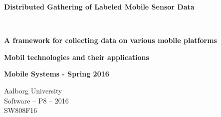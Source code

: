 
\begin{center}
	
	\vspace{8cm}

	\begin{spacing}{2.1}
		\begin{Huge}
			\textbf{Distributed Gathering of Labeled Mobile Sensor Data}
		\end{Huge}
		\\
		\begin{huge}
			\textbf{A framework for collecting data on various mobile platforms}
		\end{huge}
	\end{spacing}

	\vspace{0.6cm}

	\begin{Large}
		\textbf{Mobil technologies and their applications}
	\end{Large}

	\vspace{1cm}

	\begin{large} 
		\textbf{Mobile Systems - Spring 2016}
	\end{large}

	\vspace*{\fill}

	\vspace*{\fill}

	Aalborg University		\\
	Software -- P8 -- 2016	\\
	SW808F16				\\

\end{center}



\thispagestyle{empty}
